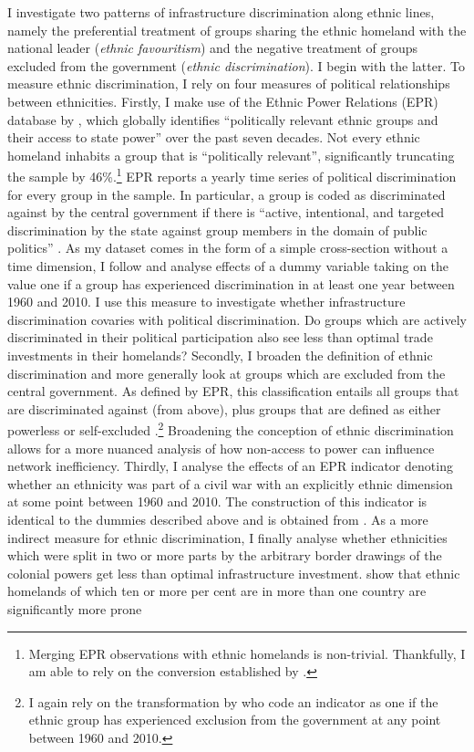 \documentclass[11pt, oneside]{article}   	%
\begin{document}
I investigate two patterns of infrastructure discrimination along ethnic lines, namely the preferential treatment of groups sharing the ethnic homeland with the national leader (\emph{ethnic favouritism}) and the negative treatment of groups excluded from the government (\emph{ethnic discrimination}). I begin with the latter. To measure ethnic discrimination, I rely on four measures of political relationships between ethnicities. Firstly, I make use of the Ethnic Power Relations (EPR) database by \cite{Vogt_IntegratingDataEthnicity_2015}, which globally identifies ``politically relevant ethnic groups and their access to state power'' \citep[p. 1328]{Vogt_IntegratingDataEthnicity_2015} over the past seven decades. Not every ethnic homeland inhabits a group that is ``politically relevant'', significantly truncating the sample by 46\%.\footnote{Merging EPR observations with ethnic homelands is non-trivial. Thankfully, I am able to rely on the conversion established by \cite{michalopoulos_long-run_2016}.} EPR reports a yearly time series of political discrimination for every group in the sample. In particular, a group is coded as discriminated against by the central government if there is ``active, intentional, and targeted discrimination by the state against group members in the domain of public politics'' \citep[p. 1331]{Vogt_IntegratingDataEthnicity_2015}. As my dataset comes in the form of a simple cross-section without a time dimension, I follow \cite{michalopoulos_long-run_2016} and analyse effects of a dummy variable taking on the value one if a group has experienced discrimination in at least one year between 1960 and 2010. I use this measure to investigate whether infrastructure discrimination covaries with political discrimination. Do groups which are actively discriminated in their political participation also see less than optimal trade investments in their homelands? Secondly, I broaden the definition of ethnic discrimination and more generally look at groups which are excluded from the central government. As defined by EPR, this classification entails all groups that are discriminated against (from above), plus groups that are defined as either powerless or self-excluded \citep[p. 1331]{Vogt_IntegratingDataEthnicity_2015}.\footnote{I again rely on the transformation by \cite{michalopoulos_long-run_2016} who code an indicator as one if the ethnic group has experienced exclusion from the government at any point between 1960 and 2010.} Broadening the conception of ethnic discrimination allows for a more nuanced analysis of how non-access to power can influence network inefficiency. Thirdly, I analyse the effects of an EPR indicator denoting whether an ethnicity was part of a civil war with an explicitly ethnic dimension at some point between 1960 and 2010. The construction of this indicator is identical to the dummies described above and is obtained from \cite{michalopoulos_long-run_2016}. As a more indirect measure for ethnic discrimination, I finally analyse whether ethnicities which were split in two or more parts by the arbitrary border drawings of the colonial powers get less than optimal infrastructure investment. \cite{michalopoulos_long-run_2016} show that ethnic homelands of which ten or more per cent are in more than one country are significantly more prone 
\end{document}
